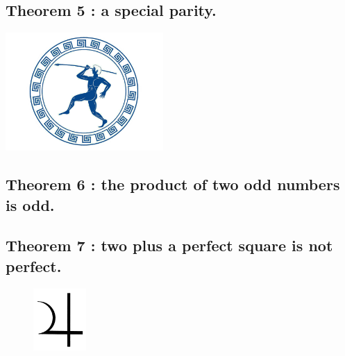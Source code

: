 \documentclass[preview]{standalone}
\begin{document}
\subsection[A special parity.]{\color{section} Theorem 5 \color{black} : a special parity.}

\begin{center}
    \includegraphics[width=6cm]{../resources/jpg/1.6.introduction.to.proofs/olympics.jpg}
\end{center}


\subsection[The product of two odd numbers is odd.]{\color{section} Theorem 6 \color{black} : the product of two odd numbers is odd.}

\pagebreak


\subsection[Two plus a perfect square is not perfect.]{\color{section} Theorem 7 \color{black} : two plus a perfect square is not perfect.}

\vspace{1\baselineskip}
\begin{figure}[h!]
    \centering
    \includegraphics[width=2cm]{../resources/jpg/1.6.introduction.to.proofs/zeus.jpg}
\end{figure} 
\pagebreak
\end{document}
